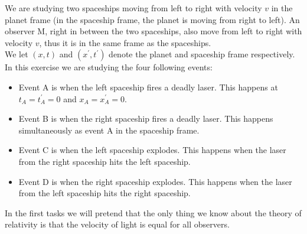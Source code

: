 \documentclass[a4paper,10pt,english]{article}
\begin{document}
We are studying two spaceships moving from left to right with velocity $v$ in the planet frame (in the spaceship frame, the planet is moving from right to left). An observer M, right in between the two spaceships, also move from left to right with velocity $v$, thus it is in the same frame as the spaceships.
\\
We let $(x,t)$ and $(x^{\prime},t^{\prime})$ denote the planet and spaceship frame respectively. In this exercise we are studying the four following events:
\begin{itemize}
\item Event A is when the left spaceship fires a deadly laser. This happens at $t_{A}=t_{A}^{\prime}=0$ and $x_{A}=x_{A}^{\prime}=0$.
\item Event B is when the right spaceship fires a deadly laser. This happens simultaneously as event A in the spaceship frame.
\item Event C is when the left spaceship explodes. This happens when the laser from the right spaceship hits the left spaceship.
\item Event D is when the right spaceship explodes. This happens when the laser from the left spaceship hits the right spaceship.
\end{itemize}

In the first tasks we will pretend that the only thing we know about the theory of relativity is that the velocity of light is equal for all observers.
\end{document}
